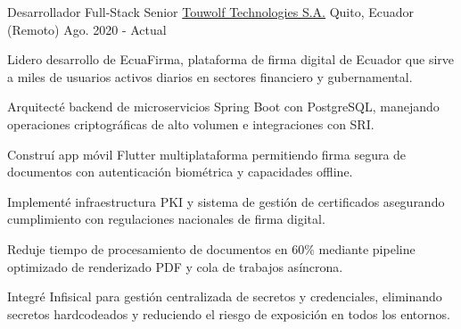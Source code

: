 
\begin{cventries}

  \cventry
    {Desarrollador Full-Stack Senior} %
    {\href{https://touwolf.com/}{Touwolf Technologies S.A.}} %
    {Quito, Ecuador (Remoto)} %
    {Ago. 2020 - Actual} %
    {
      \begin{cvitems} %
        \item {Lidero desarrollo de EcuaFirma, plataforma de firma digital de Ecuador que sirve a miles de usuarios activos diarios en sectores financiero y gubernamental.}
        \item {Arquitecté backend de microservicios Spring Boot con PostgreSQL, manejando operaciones criptográficas de alto volumen e integraciones con SRI.}
        \item {Construí app móvil Flutter multiplataforma permitiendo firma segura de documentos con autenticación biométrica y capacidades offline.}
        \item {Implementé infraestructura PKI y sistema de gestión de certificados asegurando cumplimiento con regulaciones nacionales de firma digital.}
        \item {Reduje tiempo de procesamiento de documentos en 60\% mediante pipeline optimizado de renderizado PDF y cola de trabajos asíncrona.}
        \item {Integré Infisical para gestión centralizada de secretos y credenciales, eliminando secretos hardcodeados y reduciendo el riesgo de exposición en todos los entornos.}
      \end{cvitems}
    }


\end{cventries}
